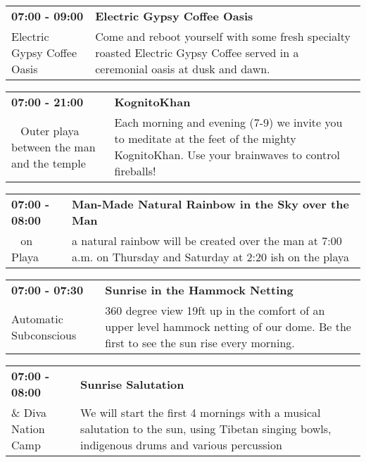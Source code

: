 \begin{tabular}{ p{1in} p{2.2in} }
    \textbf{07:00 - 09:00} & \textbf{Electric Gypsy Coffee Oasis} \\
    Electric Gypsy Coffee Oasis \newline  & Come and reboot yourself with some fresh specialty roasted Electric Gypsy Coffee served in a ceremonial oasis at dusk and dawn. \\
    \hline 
\end{tabular}
    
\begin{tabular}{ p{1in} p{2.2in} }
    \textbf{07:00 - 21:00} & \textbf{KognitoKhan} \\
    ~ \newline Outer playa between the man and the temple & Each morning and evening (7-9) we invite you to meditate at the feet of the mighty KognitoKhan. Use your brainwaves to control fireballs! \\
    \hline 
\end{tabular}
    
\begin{tabular}{ p{1in} p{2.2in} }
    \textbf{07:00 - 08:00} & \textbf{Man-Made Natural Rainbow in the Sky  over the Man} \\
    ~ \newline on Playa & a natural rainbow will be created over the man at 7:00 a.m. on Thursday and Saturday at 2:20 ish on the playa \\
    \hline 
\end{tabular}
    
\begin{tabular}{ p{1in} p{2.2in} }
    \textbf{07:00 - 07:30} & \textbf{Sunrise in the Hammock Netting} \\
    Automatic Subconscious \newline  & 360 degree view 19ft up in the comfort of an upper level hammock netting of our dome. Be the first to see the sun rise every morning. \\
    \hline 
\end{tabular}
    
\begin{tabular}{ p{1in} p{2.2in} }
    \textbf{07:00 - 08:00} & \textbf{Sunrise Salutation} \\
    \& \newline Diva Nation Camp & We will start the first 4 mornings with a musical salutation to the sun, using Tibetan singing bowls, indigenous drums and various percussion \\
    \hline 
\end{tabular}
    
